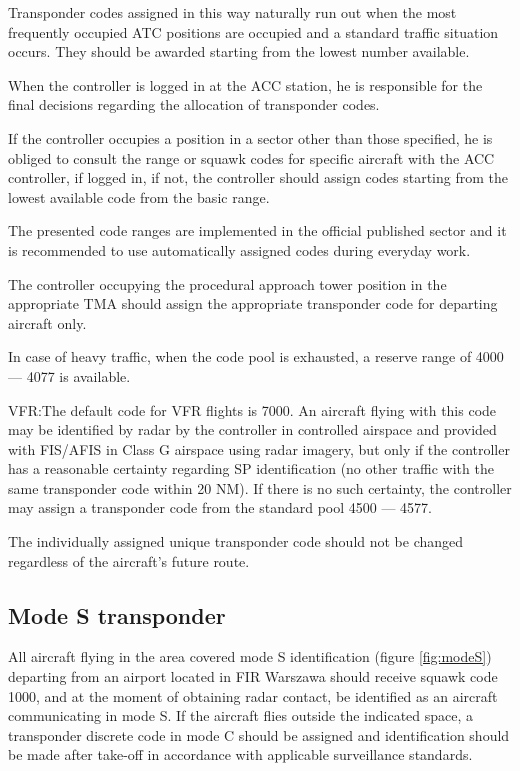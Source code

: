 Transponder codes assigned in this way naturally run out when the most frequently occupied ATC positions are occupied and a standard traffic situation occurs. They should be awarded starting from the lowest number available.

When the controller is logged in at the ACC station, he is responsible for the final decisions regarding the allocation of transponder codes.

If the controller occupies a position in a sector other than those specified, he is obliged to consult the range or squawk codes for specific aircraft with the ACC controller, if logged in, if not, the controller should assign codes starting from the lowest available code from the basic range.

The presented code ranges are implemented in the official published sector and it is recommended to use automatically assigned codes during everyday work.

The controller occupying the procedural approach tower position in the appropriate TMA should assign the appropriate transponder code for departing aircraft only.

In case of heavy traffic, when the code pool is exhausted, a reserve range of 4000 --- 4077 is available.

VFR:\@ The default code for VFR flights is 7000. An aircraft flying with this code may be identified by radar by the controller in controlled airspace and provided with FIS/AFIS in Class G airspace using radar imagery, but only if the controller has a reasonable certainty regarding SP identification (no other traffic with the same transponder code within 20 NM). If there is no such certainty, the controller may assign a transponder code from the standard pool 4500 --- 4577.

The individually assigned unique transponder code should not be changed regardless of the aircraft's future route.

\subsection{Mode S transponder}

All aircraft flying in the area covered mode S identification (figure \ref{fig:modeS}) departing from an airport located in FIR Warszawa should receive squawk code 1000, and at the moment of obtaining radar contact, be identified as an aircraft communicating in mode S. If the aircraft flies outside the indicated space, a transponder discrete code in mode C should be assigned and identification should be made after take-off in accordance with applicable surveillance standards.

